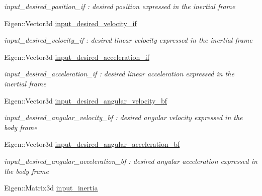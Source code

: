 \begin{DoxyCompactItemize}
\begin{DoxyCompactList}\small\item\em input\-\_\-desired\-\_\-position\-\_\-if \-: desired position expressed in the inertial frame \end{DoxyCompactList}\item 
\hypertarget{struct_skye_parameters_a9f3ba3a6ad434b885dd7ce76fbe9f7b4}{Eigen\-::\-Vector3d \hyperlink{struct_skye_parameters_a9f3ba3a6ad434b885dd7ce76fbe9f7b4}{input\-\_\-desired\-\_\-velocity\-\_\-if}}\label{struct_skye_parameters_a9f3ba3a6ad434b885dd7ce76fbe9f7b4}

\begin{DoxyCompactList}\small\item\em input\-\_\-desired\-\_\-velocity\-\_\-if \-: desired linear velocity expressed in the inertial frame \end{DoxyCompactList}\item 
\hypertarget{struct_skye_parameters_a931b644ebe7201095e350bf9a1ea1365}{Eigen\-::\-Vector3d \hyperlink{struct_skye_parameters_a931b644ebe7201095e350bf9a1ea1365}{input\-\_\-desired\-\_\-acceleration\-\_\-if}}\label{struct_skye_parameters_a931b644ebe7201095e350bf9a1ea1365}

\begin{DoxyCompactList}\small\item\em input\-\_\-desired\-\_\-acceleration\-\_\-if \-: desired linear acceleration expressed in the inertial frame \end{DoxyCompactList}\item 
\hypertarget{struct_skye_parameters_a92ab3db245b3e4e62f01f828a4838cdc}{Eigen\-::\-Vector3d \hyperlink{struct_skye_parameters_a92ab3db245b3e4e62f01f828a4838cdc}{input\-\_\-desired\-\_\-angular\-\_\-velocity\-\_\-bf}}\label{struct_skye_parameters_a92ab3db245b3e4e62f01f828a4838cdc}

\begin{DoxyCompactList}\small\item\em input\-\_\-desired\-\_\-angular\-\_\-velocity\-\_\-bf \-: desired angular velocity expressed in the body frame \end{DoxyCompactList}\item 
\hypertarget{struct_skye_parameters_af0ea0ec407eaef0ddec28e96ab098d1c}{Eigen\-::\-Vector3d \hyperlink{struct_skye_parameters_af0ea0ec407eaef0ddec28e96ab098d1c}{input\-\_\-desired\-\_\-angular\-\_\-acceleration\-\_\-bf}}\label{struct_skye_parameters_af0ea0ec407eaef0ddec28e96ab098d1c}

\begin{DoxyCompactList}\small\item\em input\-\_\-desired\-\_\-angular\-\_\-acceleration\-\_\-bf \-: desired angular acceleration expressed in the body frame \end{DoxyCompactList}\item 
\hypertarget{struct_skye_parameters_a008add5ffc2700bd3af1caec5411af1d}{Eigen\-::\-Matrix3d \hyperlink{struct_skye_parameters_a008add5ffc2700bd3af1caec5411af1d}{input\-\_\-inertia}}\label{struct_skye_parameters_a008add5ffc2700bd3af1caec5411af1d}


\end{DoxyCompactItemize}
